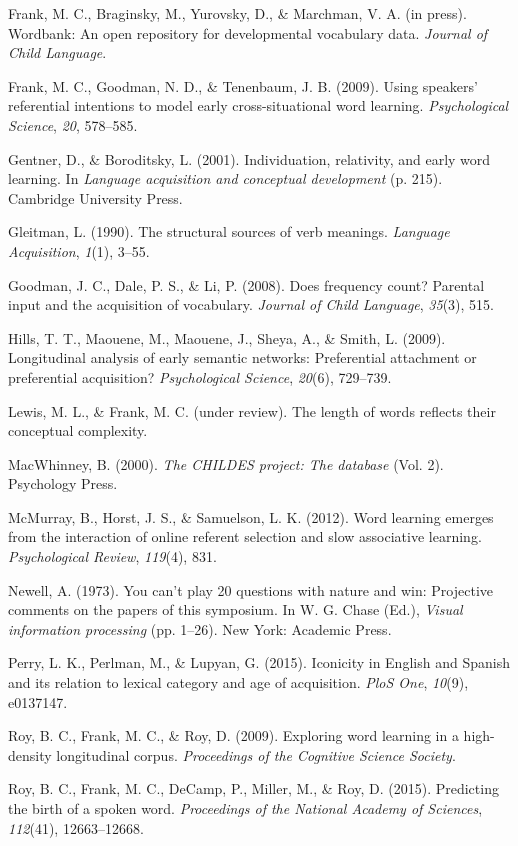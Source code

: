 \documentclass[10pt, letterpaper]{article}
\begin{document}
Frank, M. C., Braginsky, M., Yurovsky, D., \& Marchman, V. A. (in
press). Wordbank: An open repository for developmental vocabulary data.
\emph{Journal of Child Language}.

Frank, M. C., Goodman, N. D., \& Tenenbaum, J. B. (2009). Using
speakers' referential intentions to model early cross-situational word
learning. \emph{Psychological Science}, \emph{20}, 578--585.

Gentner, D., \& Boroditsky, L. (2001). Individuation, relativity, and
early word learning. In \emph{Language acquisition and conceptual
development} (p. 215). Cambridge University Press.

Gleitman, L. (1990). The structural sources of verb meanings.
\emph{Language Acquisition}, \emph{1}(1), 3--55.

Goodman, J. C., Dale, P. S., \& Li, P. (2008). Does frequency count?
Parental input and the acquisition of vocabulary. \emph{Journal of Child
Language}, \emph{35}(3), 515.

Hills, T. T., Maouene, M., Maouene, J., Sheya, A., \& Smith, L. (2009).
Longitudinal analysis of early semantic networks: Preferential
attachment or preferential acquisition? \emph{Psychological Science},
\emph{20}(6), 729--739.

Lewis, M. L., \& Frank, M. C. (under review). The length of words
reflects their conceptual complexity.

MacWhinney, B. (2000). \emph{The CHILDES project: The database} (Vol.
2). Psychology Press.

McMurray, B., Horst, J. S., \& Samuelson, L. K. (2012). Word learning
emerges from the interaction of online referent selection and slow
associative learning. \emph{Psychological Review}, \emph{119}(4), 831.

Newell, A. (1973). You can't play 20 questions with nature and win:
Projective comments on the papers of this symposium. In W. G. Chase
(Ed.), \emph{Visual information processing} (pp. 1--26). New York:
Academic Press.

Perry, L. K., Perlman, M., \& Lupyan, G. (2015). Iconicity in English
and Spanish and its relation to lexical category and age of acquisition.
\emph{PloS One}, \emph{10}(9), e0137147.

Roy, B. C., Frank, M. C., \& Roy, D. (2009). Exploring word learning in
a high-density longitudinal corpus. \emph{Proceedings of the Cognitive
Science Society}.

Roy, B. C., Frank, M. C., DeCamp, P., Miller, M., \& Roy, D. (2015).
Predicting the birth of a spoken word. \emph{Proceedings of the National
Academy of Sciences}, \emph{112}(41), 12663--12668.
\end{document}
